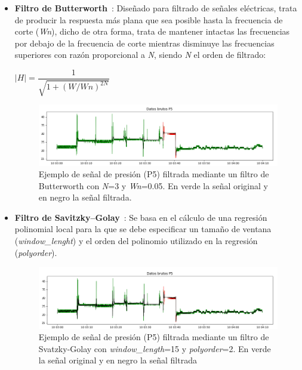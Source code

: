 \begin{itemize}
	\item \textbf{Filtro de Butterworth}~\cite{wiki:butterworth,scipybutter}: Diseñado para filtrado de señales eléctricas, trata de producir la respuesta más plana que sea posible hasta la frecuencia de corte (\textit{Wn}), dicho de otra forma, trata de mantener intactas las frecuencias por debajo de la frecuencia de corte mientras disminuye las frecuencias superiores con razón proporcional a \textit{N}, siendo \textit{N} el orden de filtrado:
	\begin{center}
		$|H| = \dfrac{1}{\sqrt{1+(W/Wn)^{2N}}}$
	\end{center}

	\begin{figure}[H]
		\centering
		\includegraphics[width=1\textwidth]{../img/senalP5butter.png}
		\caption[Señal de presión (P5) filtrada con Butterworth.] {Ejemplo de señal de presión (P5) filtrada mediante un filtro de Butterworth con \textit{N}=3 y \textit{Wn}=0.05. En verde la señal original y en negro la señal filtrada.}
		\label{fig:senalP5butter}
	\end{figure}
	
	\item \textbf{Filtro de Savitzky–Golay}~\cite{wiki:savitzkygolay,scipysavgol}: Se basa en el cálculo de una regresión polinomial local para la que se debe especificar un tamaño de ventana (\textit{window\_lenght}) y el orden del polinomio utilizado en la regresión (\textit{polyorder}). 
	
	\begin{figure}[H]
		\centering
		\includegraphics[width=1\textwidth]{../img/senalP5savgol.png}
		\caption[Señal de presión (P5) filtrada con Svatzky-Golay.]{Ejemplo de señal de presión (P5) filtrada mediante un filtro de Svatzky-Golay con \textit{window\_length}=15 y \textit{polyorder}=2. En verde la señal original y en negro la señal filtrada}
		\label{fig:senalP5savgol}
	\end{figure}
\end{itemize}

